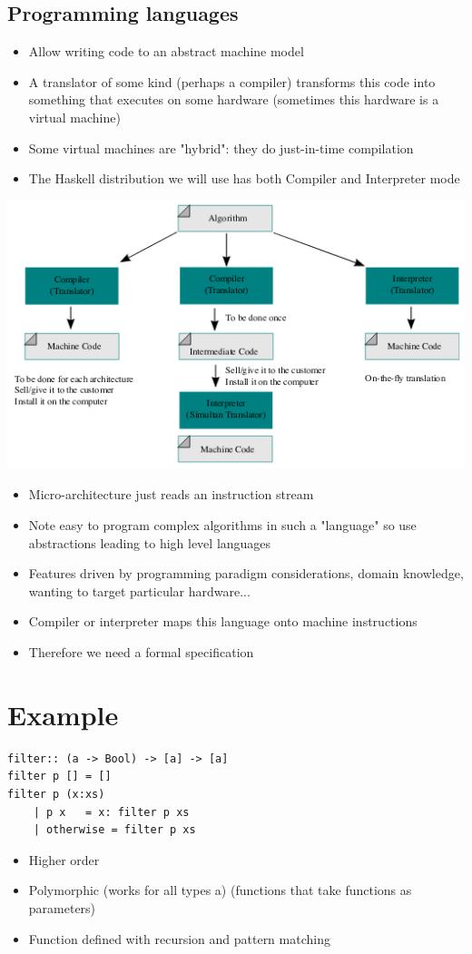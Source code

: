 \documentclass{article}[18pt]
\begin{document}
\subsection{Programming languages}
\begin{itemize}
	\item Allow writing code to an abstract machine model
	\item A translator of some kind (perhaps a compiler) transforms this code into something that executes on some hardware (sometimes this hardware is a virtual machine)
	\item Some virtual machines are "hybrid": they do just-in-time compilation
	\item The Haskell distribution we will use has both Compiler and Interpreter mode
\end{itemize}
\begin{center}
	\includegraphics[scale=0.7]{Compiler}
\end{center}
\begin{itemize}
	\item Micro-architecture just reads an instruction stream
	\item Note easy to program complex algorithms in such a "language" so use abstractions leading to high level languages
	\item Features driven by programming paradigm considerations, domain knowledge, wanting to target particular hardware...
	\item Compiler or interpreter maps this language onto machine instructions
	\item Therefore we need a formal specification 
\end{itemize}
\section{Example}
\begin{verbatim}
filter:: (a -> Bool) -> [a] -> [a]
filter p [] = []
filter p (x:xs)
	| p x 	= x: filter p xs
	| otherwise	= filter p xs
\end{verbatim}
\begin{itemize}
	\item Higher order
	\item Polymorphic (works for all types a) (functions that take functions as parameters)
	\item Function defined with recursion and pattern matching
\end{itemize}
\end{document}
